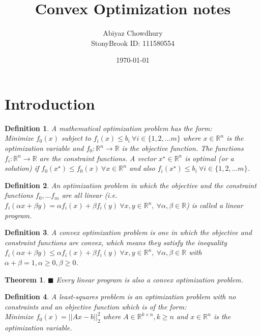 \documentclass[a4paper]{article}
\title{\textbf{Convex Optimization notes}}
\author{Abiyaz Chowdhury \\ StonyBrook ID: 111580554}
\date{\today}
\newtheorem{mytheorem}{Theorem}
\newtheorem{mydef}{Definition}
\numberwithin{mytheorem}{section}
\numberwithin{mydef}{section}
\numberwithin{example}{section}
\newcommand{\done}{$\blacksquare$ }
\begin{document}
\maketitle

\section{Introduction}

\begin{mydef} A mathematical optimization problem has the form: \\ Minimize $f_{0}(x)$ subject to $f_{i}(x) \leq b_{i} \ \forall i \in \{1,2,...m\}$  where $x \in \mathbb{R}^{n}$ is the optimization variable and $f_{0} : \mathbb{R}^{n} \rightarrow \mathbb{R}$ is the objective function. The functions $f_{i}: \mathbb{R}^{n} \rightarrow \mathbb{R}$ are the constraint functions. A vector $x^{\star} \in \mathbb{R}^{n}$ is optimal (or a solution) if $f_{0}(x^{\star}) \leq f_{0}(x) \ \forall x \in \mathbb{R}^{n}$ and also $f_{i}(x^{\star}) \leq b_{i} \ \forall i \in \{1,2,...m\}$. 
\end{mydef}

\begin{mydef} An optimization problem in which the objective and the constraint functions $f_{0},...f_{m}$ are all linear (i.e. $f_{i}(\alpha x + \beta y) = \alpha f_{i}(x) + \beta f_{i}(y) \ \forall x,y \in \mathbb{R}^{n}, \ \forall \alpha,\beta \in \mathbb{R}$) is called a linear program.
\end{mydef}

\begin{mydef} A convex optimization problem is one in which the objective and constraint functions are convex, which means they satisfy the inequality $f_{i}(\alpha x + \beta y) \leq \alpha f_{i}(x) + \beta f_{i}(y) \ \forall x,y \in \mathbb{R}^{n}, \ \forall \alpha,\beta \in \mathbb{R}$ with $\alpha + \beta = 1, \alpha \geq 0, \beta \geq 0$.
\end{mydef}

\begin{mytheorem} \done Every linear program is also a convex optimization problem. \end{mytheorem}

\begin{mydef} A least-squares problem is an optimization problem with no constraints and an objective function which is of the form: \\
Minimize $f_{0}(x) = ||Ax - b|| ^{2}_{2}$ where $A \in \mathbb{R}^{k \times n}, k \geq n$ and $x \in \mathbb{R}^{n}$ is the optimization variable.
\end{mydef}
\end{document}
